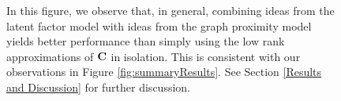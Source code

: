\begin{figure}[ht]
  \begin{center}
  \end{center}
  \caption{In this figure, we observe that, in general, combining ideas from the latent factor model with ideas from the graph proximity model yields better performance than simply using the low rank approximations of $\mathbf{C}$ in isolation. This is consistent with our observations in Figure \ref{fig:summaryResults}. See Section \ref{Results and Discussion} for further discussion.}
  \label{fig:summarySVDKatz}
\end{figure}

